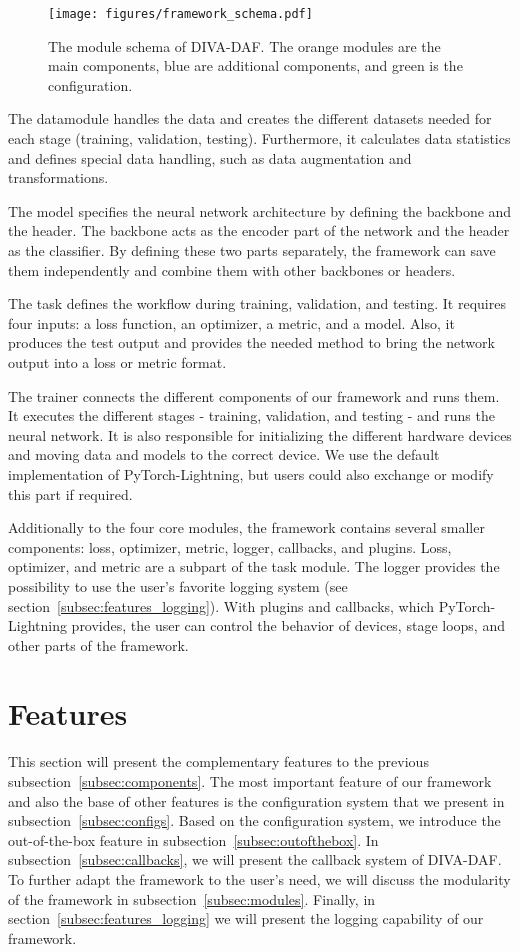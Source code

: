 \documentclass[runningheads]{llncs}
\begin{document}
\begin{figure}[ht]
    \centering
    \texttt{[image: figures/framework\_schema.pdf]}
    \caption{The module schema of DIVA-DAF. The orange modules are the main components, blue are additional components, and green is the configuration.}
    \label{fig:framework_schema}
\end{figure}

The datamodule handles the data and creates the different datasets needed for each stage (training, validation, testing). Furthermore, it calculates data statistics and defines special data handling, such as data augmentation and transformations.

The model specifies the neural network architecture by defining the backbone and the header. The backbone acts as the encoder part of the network and the header as the classifier. By defining these two parts separately, the framework can save them independently and combine them with other backbones or headers.

The task defines the workflow during training, validation, and testing. It requires four inputs: a loss function, an optimizer, a metric, and a model. Also, it produces the test output and provides the needed method to bring the network output into a loss or metric format. 

The trainer connects the different components of our framework and runs them. It executes the different stages - training, validation, and testing - and runs the neural network. It is also responsible for initializing the different hardware devices and moving data and models to the correct device. We use the default implementation of PyTorch-Lightning, but users could also exchange or modify this part if required.

Additionally to the four core modules, the framework contains several smaller components: loss, optimizer, metric, logger, callbacks, and plugins. Loss, optimizer, and metric are a subpart of the task module. The logger provides the possibility to use the user's favorite logging system (see section~\ref{subsec:features_logging}). With plugins and callbacks, which PyTorch-Lightning provides, the user can control the behavior of devices, stage loops, and other parts of the framework.

 
\section{Features}\label{sec:features}
This section will present the complementary features to the previous subsection~\ref{subsec:components}.
The most important feature of our framework and also the base of other features is the configuration system that we present in subsection~\ref{subsec:configs}.
Based on the configuration system, we introduce the out-of-the-box feature in subsection~\ref{subsec:outofthebox}.
In subsection~\ref{subsec:callbacks}, we will present the callback system of DIVA-DAF.
To further adapt the framework to the user's need, we will discuss the modularity of the framework in subsection~\ref{subsec:modules}.
Finally, in section~\ref{subsec:features_logging} we will present the logging capability of our framework. 
\end{document}
